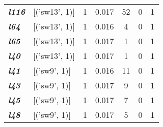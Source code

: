 \begin{table}
\begin{tabular}{llccccc}
    \textit{\textbf{l116}}                                          & {[}('sw13', 1){]}                         & 1             & 0.017              & 52             & 0              & 1           \\
    \textit{\textbf{l64}}                                           & {[}('sw13', 1){]}                         & 1             & 0.016              & 4              & 0              & 1           \\
    \textit{\textbf{l65}}                                           & {[}('sw13', 1){]}                         & 1             & 0.017              & 1              & 0              & 1           \\
    \textit{\textbf{l40}}                                           & {[}('sw13', 1){]}                         & 1             & 0.017              & 1              & 0              & 1           \\
    \textit{\textbf{l41}}                                           & {[}('sw9', 1){]}                          & 1             & 0.016              & 11             & 0              & 1           \\
    \textit{\textbf{l43}}                                           & {[}('sw9', 1){]}                          & 1             & 0.017              & 9              & 0              & 1           \\
    \textit{\textbf{l45}}                                           & {[}('sw9', 1){]}                          & 1             & 0.017              & 7              & 0              & 1           \\
    \textit{\textbf{l48}}                                           & {[}('sw9', 1){]}                          & 1             & 0.017              & 5              & 0              & 1          
    \end{tabular}
    \end{table}